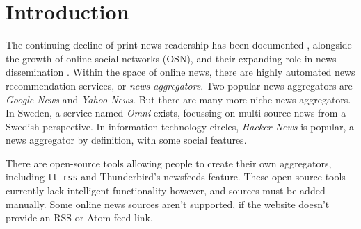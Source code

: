 \chapter{Introduction}
The continuing decline of print news readership
has been documented \cite{ma2014, nytimes2019}, alongside the
growth of online social networks (OSN), and their expanding role
in news dissemination \cite{goel2012}.  Within the space of
online news, there are highly automated news recommendation
services, or {\it news aggregators}.  Two popular news aggregators
are {\it Google News} and {\it Yahoo News}.  But there are many more niche news
aggregators.  In Sweden, a service named {\it Omni} exists,
focussing on multi-source news from a Swedish perspective.  In
information technology circles, {\it Hacker News} is popular, a news
aggregator by definition, with some social features.

There are open-source tools allowing people to create their own
aggregators, including {\tt tt-rss} \cite{ttrss} and Thunderbird's newsfeeds feature.
These open-source tools currently lack intelligent functionality
however, and sources must be added manually.  Some online news
sources aren't supported, if the website doesn't provide an RSS
or Atom feed link.







